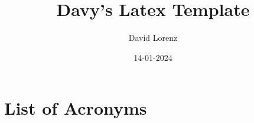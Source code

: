 \documentclass[a4paper,12pt]{article}
\author{David Lorenz}
\title{Davy's Latex Template}
\date{14-01-2024}
\begin{document}
\maketitle
\thispagestyle{empty}
\newpage
\tableofcontents
\newpage



\section*{List of Acronyms}
\begin{acronym}
\end{acronym}

\printbibliography
\end{document}
